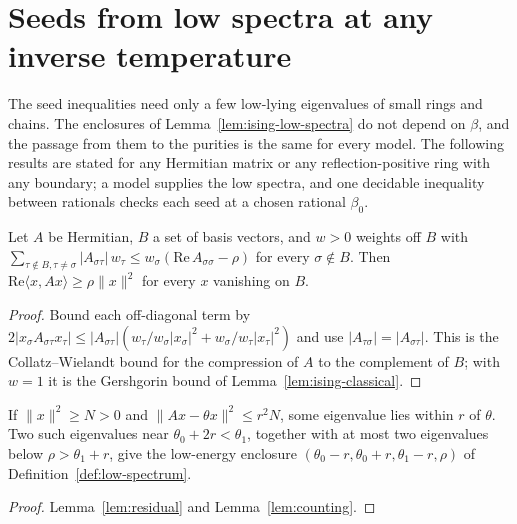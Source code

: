 \section{Seeds from low spectra at any inverse temperature}

The seed inequalities need only a few low-lying eigenvalues of small rings and chains. The
enclosures of Lemma~\ref{lem:ising-low-spectra} do not depend on \(\beta\), and the passage from
them to the purities is the same for every model. The following results are stated for any
Hermitian matrix or any reflection-positive ring with any boundary; a model supplies the low
spectra, and one decidable inequality between rationals checks each seed at a chosen rational
\(\beta_0\).

\begin{lemma}
  \label{lem:weighted-comparison}
  \leanok
  Let \(A\) be Hermitian, \(B\) a set of basis vectors, and \(w > 0\) weights off \(B\) with
  \(\sum_{\tau \notin B, \tau \ne \sigma} |A_{\sigma\tau}|\, w_\tau \le w_\sigma
  (\mathrm{Re}\, A_{\sigma\sigma} - \rho)\) for every \(\sigma \notin B\). Then
  \(\mathrm{Re}\langle x, A x\rangle \ge \rho \|x\|^2\) for every \(x\) vanishing on \(B\).
\end{lemma}
\begin{proof}
  \leanok
  Bound each off-diagonal term by
  \(2 |x_\sigma A_{\sigma\tau} x_\tau| \le |A_{\sigma\tau}| (w_\tau/w_\sigma |x_\sigma|^2 +
  w_\sigma/w_\tau |x_\tau|^2)\) and use \(|A_{\tau\sigma}| = |A_{\sigma\tau}|\). This is the
  Collatz--Wielandt bound for the compression of \(A\) to the complement of \(B\); with \(w = 1\)
  it is the Gershgorin bound of Lemma~\ref{lem:ising-classical}.
\end{proof}

\begin{lemma}
  \label{lem:low-spectrum-of-near}
  \leanok
  If \(\|x\|^2 \ge N > 0\) and \(\|Ax - \theta x\|^2 \le r^2 N\), some eigenvalue lies within \(r\)
  of \(\theta\). Two such eigenvalues near \(\theta_0 + 2r < \theta_1\), together with at most two
  eigenvalues below \(\rho > \theta_1 + r\), give the low-energy enclosure
  \((\theta_0 - r, \theta_0 + r, \theta_1 - r, \rho)\) of Definition~\ref{def:low-spectrum}.
\end{lemma}
\begin{proof}
  \leanok
  Lemma~\ref{lem:residual} and Lemma~\ref{lem:counting}.
\end{proof}

